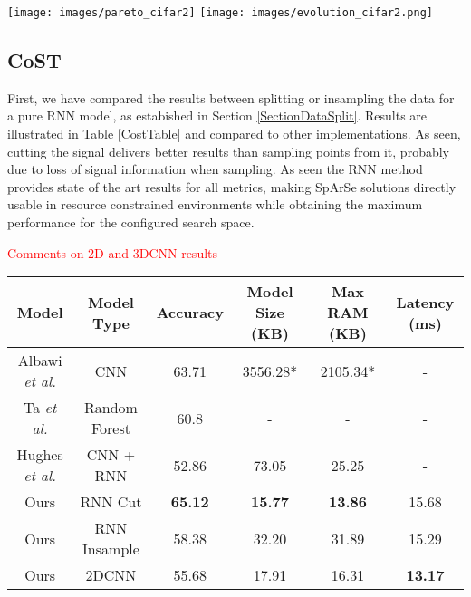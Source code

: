 \documentclass[10pt, a4paper, twocolumn]{article}
\begin{document}
\begin{figure*}[bp]
	\centering
	\texttt{[image: images/pareto\_cifar2]}
	\texttt{[image: images/evolution\_cifar2.png]}
	\caption{Left: Pareto frontier for our implementation of Sparse and Cifar 10 Binary. Notice the different possibilities to choose among regarding RAM, size and performance. Each point corresponds to a specific configuration of the search space. Right: full search procedure for CIFAR-10 Binary with the modified SpArSe. The color degradation shows the progress of the search.}
	\label{fig:paretocifar2}
\end{figure*}



\subsection{CoST}
First, we have compared the results between splitting or insampling the data for a pure RNN model, as estabished in Section \ref{SectionDataSplit}. Results are illustrated in Table \ref{CostTable} and compared to other implementations. As seen, cutting the signal delivers better results than sampling points from it, probably due to loss of signal information when sampling. As seen the RNN method provides state of the art results for all metrics, making SpArSe solutions directly usable in resource constrained environments while obtaining the maximum performance for the configured search space. 

\textcolor{red}{Comments on 2D and 3DCNN results}

\begin{table*}
\center
\begin{tabular}{|c|c|c|c|c|c|}
	\hline
	Model	& Model Type & Accuracy & Model Size (KB) & Max RAM (KB) & Latency (ms) \\
	\hline
	Albawi \textit{et al.} \cite{Albawi2018}  & CNN & 63.71  & 3556.28* & 2105.34*  & -  \\
	\hline
	Ta \textit{et al.} \cite{Ta2015a} & Random Forest & 60.8  & -  & - & -  \\
	\hline
	Hughes \textit{et al.} \cite{Hughes2017} & CNN + RNN & 52.86 &  73.05 & 25.25 & -  \\
	\hline
	Ours & RNN Cut & \textbf{65.12} & \textbf{15.77} & \textbf{13.86} & 15.68 \\
	\hline
	Ours & RNN Insample & 58.38 & 32.20 & 31.89 & 15.29 \\
	\hline
	Ours & 2DCNN & 55.68 & 17.91 & 16.31 & \textbf{13.17} \\
	\hline
	
\end{tabular}
\caption{Results for the CoST dataset with hold one subject out cross validation, as in \cite{Albawi2018} and \cite{Jung2015}. * indicates that it has been estimated from the netowrk details in original .paper}\label{CostTable}
\end{table*}
\end{document}
